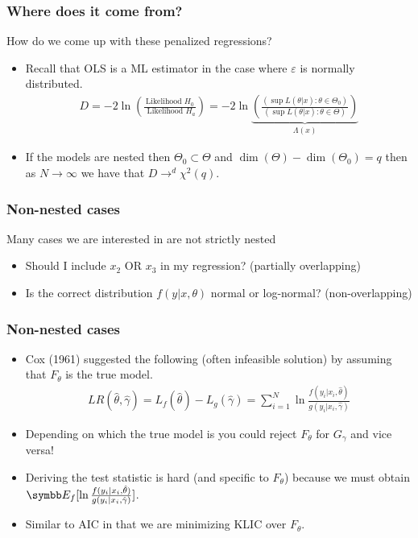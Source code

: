 \documentclass[aspectratio=169,11pt]{beamer}
\begin{document}
\begin{frame}
\frametitle{Where does it come from?}
How do we come up with these penalized regressions?
\begin{itemize}
\item Recall that OLS is a ML estimator in the case where $\varepsilon$ is normally distributed.
\begin{eqnarray*}
D = - 2 \ln \left (\frac{\mbox{Likelihood  } H_0}{\mbox{ Likelihood  }H_a} \right) = -2 \ln \underbrace{\left(\frac{(\sup L(\theta | x) : \theta \in \Theta_0)}{(\sup L(\theta | x) : \theta \in \Theta)}\right)}_{\Lambda(x)}
\end{eqnarray*}
\item If the models are \alert{nested} then $\Theta_0 \subset \Theta$ and $\dim(\Theta) -\dim(\Theta_0) = q$ then as $N\rightarrow \infty$ we have that $D \rightarrow^d \chi^2(q)$.
\end{itemize}
\end{frame}

\begin{frame}
\frametitle{Non-nested cases}
Many cases we are interested in are \alert{not strictly nested}
\begin{itemize}
\item Should I include $x_2$ OR $x_3$ in my regression? (partially overlapping)
\item Is the correct distribution $f(y | x, \theta)$ normal or log-normal? (non-overlapping)
\end{itemize}
\end{frame}

\begin{frame}
\frametitle{Non-nested cases}
\begin{itemize}
\item Cox (1961) suggested the following (often infeasible solution) by assuming that $F_{\theta}$ is the true model.
\begin{align*}
LR(\hat{\theta},\hat{\gamma}) = L_f(\hat{\theta}) - L_g (\hat{\gamma}) = \sum_{i=1}^N \ln \frac{f(y_i | x_i, \hat{\theta})}{g(y_i | x_i, \hat{\gamma})}
\end{align*}
\item Depending on which the true model is you could reject $F_{\theta}$ for $G_{\gamma}$ and vice versa!
\item Deriving the test statistic is hard (and specific to $F_{\theta}$) because we must obtain $\E_f [\ln \frac{f(y_i | x_i, \hat{\theta})}{g(y_i | x_i, \hat{\gamma})}]$.
\item Similar to AIC in that we are minimizing KLIC over $F_{\theta}$.
\end{itemize}
\end{frame}
\end{document}

